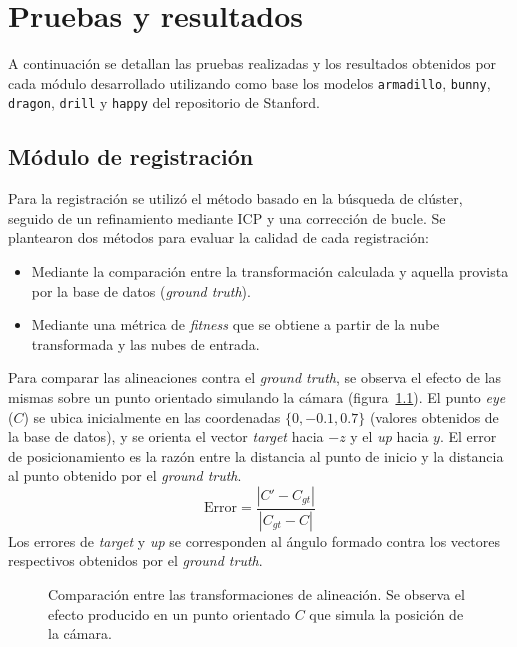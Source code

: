\chapter{Pruebas y resultados}
	A continuación se detallan las pruebas realizadas y los resultados obtenidos
	por cada módulo desarrollado utilizando como base los modelos
	\texttt{armadillo}, \texttt{bunny}, \texttt{dragon}, \texttt{drill} y \texttt{happy}
	del repositorio de Stanford\cite{StanfordScanRep}.

	\section{Módulo de registración}
	Para la registración se utilizó el método basado en la búsqueda de clúster,
	seguido de un refinamiento mediante ICP y una corrección de bucle.
	Se plantearon dos métodos para evaluar la calidad de cada registración:
	\begin{itemize}
		\item Mediante la comparación entre la transformación calculada y aquella provista por la base de datos (\emph{ground truth}).
		\item Mediante una métrica de \emph{fitness} que se obtiene a partir de la nube transformada y las nubes de entrada.
	\end{itemize}

	Para comparar las alineaciones contra el \emph{ground truth}, se
	observa el efecto de las mismas sobre un punto orientado simulando la
	cámara (figura~\ref{fig:err_reg}). El punto \emph{eye} ($C$) se ubica inicialmente en las coordenadas
	$\{0, -0.1, 0.7\}$ (valores obtenidos de la base de datos), y se
	orienta el vector \emph{target} hacia $-z$ y el \emph{up} hacia $y$.
	El error de posicionamiento es la razón entre la distancia al punto
	de inicio y la distancia al punto obtenido por el \emph{ground truth}.
	\[\text{Error} = \frac{|C'-C_{gt}|}{|C_{gt} - C|}\]
	Los errores de \emph{target} y \emph{up} se corresponden al ángulo formado contra los
	vectores respectivos obtenidos por el \emph{ground truth}.

	\begin{figure}
		\centering
		
		\caption{\label{fig:err_reg}Comparación entre las transformaciones de alineación.
		Se observa el efecto producido en un punto orientado $C$ que simula la posición de la cámara.}
	\end{figure}

